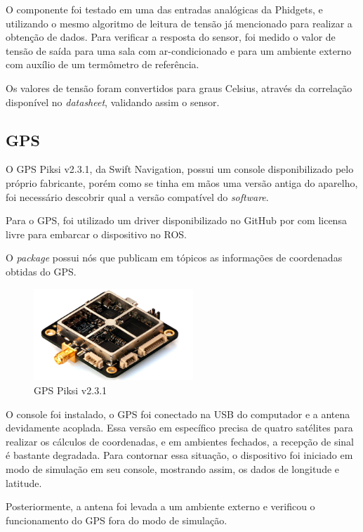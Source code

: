	    O componente foi testado em uma das entradas analógicas da Phidgets, e utilizando o mesmo algoritmo de leitura de tensão já mencionado para realizar a obtenção de dados. Para verificar a resposta do sensor, foi medido o valor de tensão de saída para uma sala com ar-condicionado e para um ambiente externo com auxílio de um termômetro de referência.
	    
	    Os valores de tensão foram convertidos para graus Celsius, através da correlação disponível no \textit{datasheet}, validando assim o sensor.
    
    \subsection{GPS}
    
	    O GPS Piksi v2.3.1, da Swift Navigation, possui um console disponibilizado pelo próprio fabricante, porém como se tinha em mãos uma versão antiga do aparelho, foi necessário descobrir qual a versão compatível do \textit{software}.
	    
	    Para o GPS, foi utilizado um driver disponibilizado no GitHub por  com licensa livre para embarcar o dispositivo no ROS.
     
     O \textit{package} possui nós que publicam em tópicos as informações de coordenadas obtidas do GPS.
	    
	    \begin{figure}[!ht]
				   \centering
				   \includegraphics[width=6cm]{Figures/gps.jpg}
				   \caption{GPS Piksi v2.3.1}
				   \label{fig:GPS}
		\end{figure}
			    
	     O console foi instalado, o GPS foi conectado na USB do computador e a antena devidamente acoplada. Essa versão em específico precisa de quatro satélites para realizar os cálculos de coordenadas, e em ambientes fechados, a recepção de sinal é bastante degradada. Para contornar essa situação, o dispositivo foi iniciado em modo de simulação em seu console, mostrando assim, os dados de longitude e latitude.
	     
	     Posteriormente, a antena foi levada a um ambiente externo e verificou o funcionamento do GPS fora do modo de simulação.    

